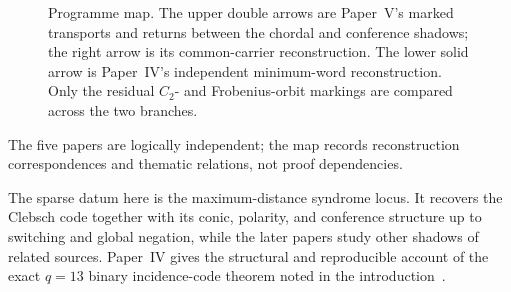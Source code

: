 \documentclass[11pt]{article}
\theoremstyle{definition}
\theoremstyle{remark}
\newcommand{\F}{\mathbb{F}}
\begin{document}
\begin{figure}[H]
\centering
{}
\caption{Programme map.  The upper double arrows are Paper~V's marked
transports and returns between the chordal and conference shadows; the right
arrow is its common-carrier reconstruction.  The lower solid arrow is
Paper~IV's independent minimum-word reconstruction.  Only the residual
\(C_2\)- and Frobenius-orbit markings are compared across the two branches.}
\label{fig:programme-map}
\end{figure}

The five papers are logically independent; the map records reconstruction
correspondences and thematic relations, not proof dependencies.

The sparse datum here is the maximum-distance syndrome locus.  It recovers
the Clebsch code together with its conic, polarity, and conference structure
up to switching and global negation,
while the later papers study other shadows of related sources.  Paper~IV gives
the
structural and reproducible account of
the exact \(q=13\) binary incidence-code theorem noted in the
introduction~\cite{RuddPassant2026}.
\end{document}

